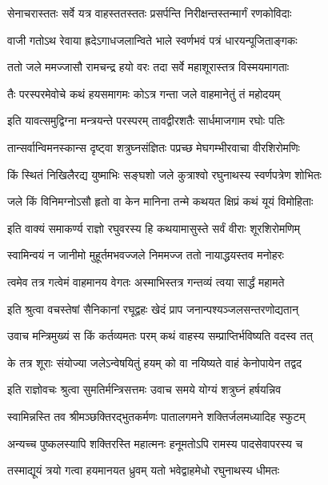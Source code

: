 \twolineshloka
{सेनाचरास्ततः सर्वे यत्र वाहस्ततस्ततः}
{प्रसर्पन्ति निरीक्षन्तस्तन्मार्गं रणकोविदाः}%

\twolineshloka
{वाजी गतोऽथ रेवाया ह्रदेऽगाधजलान्विते}
{भाले स्वर्णभवं पत्रं धारयन्पूजिताङ्गकः}%

\twolineshloka
{ततो जले ममज्जासौ रामचन्द्र हयो वरः}
{तदा सर्वे महाशूरास्तत्र विस्मयमागताः}%

\twolineshloka
{तैः परस्परमेवोचे कथं हयसमागमः}
{कोऽत्र गन्ता जले वाहमानेतुं तं महोदयम्}%

\twolineshloka
{इति यावत्समुद्विग्ना मन्त्रयन्ते परस्परम्}
{तावद्वीरशतैः सार्धमाजगाम रघोः पतिः}%

\twolineshloka
{तान्सर्वान्विमनस्कान्स दृष्ट्वा शत्रुघ्नसंज्ञितः}
{पप्रच्छ मेघगम्भीरवाचा वीरशिरोमणिः}%

\twolineshloka
{किं स्थितं निखिलैरद्य युष्माभिः सङ्घशो जले}
{कुत्राश्वो रघुनाथस्य स्वर्णपत्रेण शोभितः}%

\twolineshloka
{जले किं विनिमग्नोऽसौ हृतो वा केन मानिना}
{तन्मे कथयत क्षिप्रं कथं यूयं विमोहिताः}%


\twolineshloka
{इति वाक्यं समाकर्ण्य राज्ञो रघुवरस्य हि}
{कथयामासुस्ते सर्वं वीराः शूरशिरोमणिम्}%


\twolineshloka
{स्वामिन्वयं न जानीमो मुहूर्तमभवज्जले}
{निममज्ज ततो नायाद्धयस्तव मनोहरः}%

\twolineshloka
{त्वमेव तत्र गत्वेमं वाहमानय वेगतः}
{अस्माभिस्तत्र गन्तव्यं त्वया सार्द्धं महामते}%

\twolineshloka
{इति श्रुत्वा वचस्तेषां सैनिकानां रघूद्वहः}
{खेदं प्राप जनान्पश्यञ्जलसन्तरणोद्यतान्}%

\twolineshloka
{उवाच मन्त्रिमुख्यं स किं कर्तव्यमतः परम्}
{कथं वाहस्य सम्प्राप्तिर्भविष्यति वदस्व तत्}%

\twolineshloka
{के तत्र शूराः संयोज्या जलेऽन्वेषयितुं हयम्}
{को वा नयिष्यते वाहं केनोपायेन तद्वद}%

\twolineshloka
{इति राज्ञोवचः श्रुत्वा सुमतिर्मन्त्रिसत्तमः}
{उवाच समये योग्यं शत्रुघ्नं हर्षयन्निव}%

\twolineshloka
{स्वामिन्नस्ति तव श्रीमञ्छक्तिरद्भुतकर्मणः}
{पातालगमने शक्तिर्जलमध्यादिह स्फुटम्}%

\twolineshloka
{अन्यच्च पुष्कलस्यापि शक्तिरस्ति महात्मनः}
{हनूमतोऽपि रामस्य पादसेवापरस्य च}%

\twolineshloka
{तस्माद्यूयं त्रयो गत्वा हयमानयत ध्रुवम्}
{यतो भवेद्वाहमेधो रघुनाथस्य धीमतः}%

